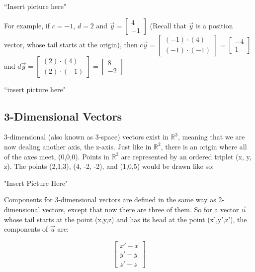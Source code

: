 ``Insert picture here"


\newpage

For example, if $c = -1$, $d = 2$ and $\overrightarrow{y} = \begin{bmatrix}
4\\-1
\end{bmatrix}$ (Recall that $\overrightarrow{y}$ is a position vector, whose tail starts at the origin), then $c\overrightarrow{y} =\begin{bmatrix}(-1)\cdot(4)\\(-1)\cdot(-1)\end{bmatrix} = \begin{bmatrix}
-4\\1
\end{bmatrix}$ and $d\overrightarrow{y}= \begin{bmatrix}(2)\cdot(4)\\(2)\cdot(-1)\end{bmatrix} = \begin{bmatrix} 8\\-2
\end{bmatrix}$

``insert picture here"

\newpage
\subsection*{3-Dimensional Vectors}

3-dimensional (also known as 3-space) vectors exist in $\mathbb{R}^3$, meaning that we are now dealing another axis, the z-axis. Just like in $\mathbb{R}^2$, there is an origin where all of the axes meet, (0,0,0). Points in $\mathbb{R}^3$ are represented by an ordered triplet (x, y, z). The points (2,1,3), (4, -2, -2), and (1,0,5) would be drawn like so:

"Insert Picture Here"



\newpage

Components for 3-dimensional vectors are defined in the same way as 2-dimensional vectors, except that now there are three of them. So for a vector $\overrightarrow{u}$ whose tail starts at the point (x,y,z) and has its head at the point (x',y',z'), the components of $\overrightarrow{u}$ are:

$$\begin{bmatrix}
x'-x\\y'-y\\z'-z
\end{bmatrix} $$

